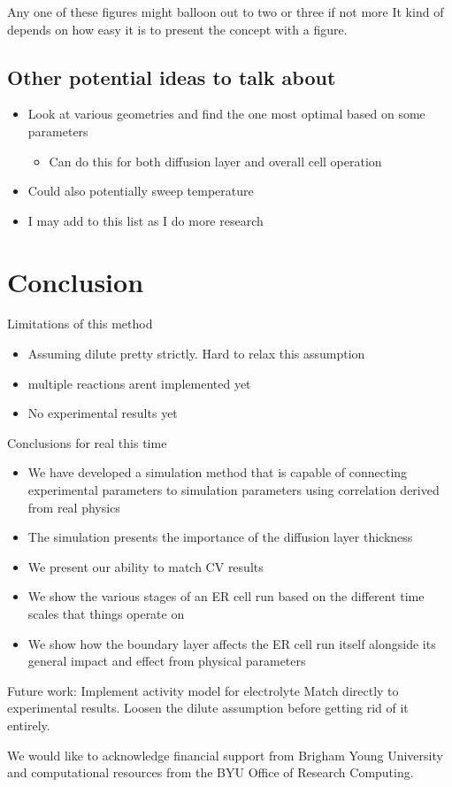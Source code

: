 \documentclass[journal=mamobx]{achemso}
\begin{document}
Any one of these figures might balloon out to two or three if not more
It kind of depends on how easy it is to present the concept with a figure.
\subsection{Other potential ideas to talk about}
\begin{itemize}
  \item Look at various geometries and find the one most optimal based on some parameters
  \begin{itemize}
    \item Can do this for both diffusion layer and overall cell operation 
  \end{itemize}
  \item Could also potentially sweep temperature
  \item I may add to this list as I do more research
\end{itemize}


\section{Conclusion}
Limitations of this method
\begin{itemize}
  \item Assuming dilute pretty strictly. Hard to relax this assumption
  \item multiple reactions arent implemented yet
  \item No experimental results yet
\end{itemize}
Conclusions for real this time
\begin{itemize}
  \item We have developed a simulation method that is capable of connecting experimental parameters to simulation parameters using correlation derived from real physics
  \item The simulation presents the importance of the diffusion layer thickness
  \item We present our ability to match CV results
  \item We show the various stages of an ER cell run based on the different time scales that things operate on
  \item We show how the boundary layer affects the ER cell run itself alongside its general impact and effect from physical parameters
\end{itemize}
Future work:
Implement activity model for electrolyte
Match directly to experimental results.
Loosen the dilute assumption before getting rid of it entirely.

\begin{acknowledgement}
We would like to acknowledge financial support from Brigham Young University and computational resources from the BYU Office of Research Computing.
\end{acknowledgement}

\clearpage

\end{document}

